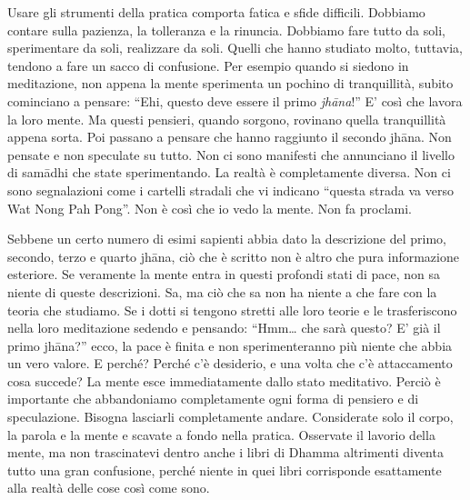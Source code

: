 Usare gli strumenti della pratica comporta fatica e sfide difficili.
Dobbiamo contare sulla pazienza, la tolleranza e la rinuncia. Dobbiamo
fare tutto da soli, sperimentare da soli, realizzare da soli. Quelli che
hanno studiato molto, tuttavia, tendono a fare un sacco di confusione.
Per esempio quando si siedono in meditazione, non appena la mente
sperimenta un pochino di tranquillità, subito cominciano a pensare:
``Ehi, questo deve essere il primo \emph{jhāna}!''%
E' così che lavora la loro mente. Ma questi pensieri, quando sorgono,
rovinano quella tranquillità appena sorta. Poi passano a pensare che
hanno raggiunto il secondo jhāna. Non pensate e non speculate su tutto.
Non ci sono manifesti che annunciano il livello di samādhi che state
sperimentando. La realtà è completamente diversa. Non ci sono
segnalazioni come i cartelli stradali che vi indicano ``questa strada va
verso Wat Nong Pah Pong''. Non è così che io vedo la mente. Non fa
proclami.

Sebbene un certo numero di esimi sapienti abbia dato la descrizione del
primo, secondo, terzo e quarto jhāna, ciò che è scritto non è altro che
pura informazione esteriore. Se veramente la mente entra in questi
profondi stati di pace, non sa niente di queste descrizioni. Sa, ma ciò
che sa non ha niente a che fare con la teoria che studiamo. Se i dotti
si tengono stretti alle loro teorie e le trasferiscono nella loro
meditazione sedendo e pensando: ``Hmm\ldots{} che sarà questo? E' già il
primo jhāna?'' ecco, la pace è finita e non sperimenteranno più niente
che abbia un vero valore. E perché? Perché c'è desiderio, e una volta
che c'è attaccamento cosa succede? La mente esce immediatamente dallo
stato meditativo. Perciò è importante che abbandoniamo completamente
ogni forma di pensiero e di speculazione. Bisogna lasciarli
completamente andare. Considerate solo il corpo, la parola e la mente e
scavate a fondo nella pratica. Osservate il lavorio della mente, ma non
trascinatevi dentro anche i libri di Dhamma altrimenti diventa tutto una
gran confusione, perché niente in quei libri corrisponde esattamente
alla realtà delle cose così come sono.

